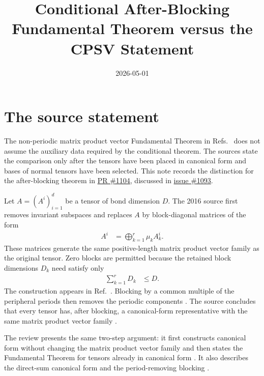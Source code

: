 \documentclass{article}
\title{Conditional After-Blocking Fundamental Theorem versus the CPSV Statement}
\author{}
\date{2026-05-01}
\begin{document}
\maketitle
{}

\section{The source statement}

The non-periodic matrix product vector Fundamental Theorem in
Refs.~\cite{Cirac2016MPDO_arXiv,Cirac2017MPDO_AnnPhys,Cirac2021Matrix} does not
assume the auxiliary data required by the conditional \Lean{} theorem. The
sources state the comparison only after the tensors have been placed in
canonical form and bases of normal tensors have been selected. This note
records the distinction for the after-blocking theorem in
\href{https://github.com/LionSR/TNLean/pull/1104}{PR \#1104}, discussed in
\href{https://github.com/LionSR/TNLean/issues/1093}{issue \#1093}.

Let $A=(A^i)_{i=1}^{d}$ be a tensor of bond dimension $D$. The 2016 source first
removes invariant subspaces and replaces $A$ by block-diagonal matrices of the
form
\begin{align}
    A^i
        &=
        \bigoplus_{k=1}^{r}\mu_k A_k^i.
    \label{eq:rmp_conditional_after_blocking_ft_statement_canonical_blocks}
\end{align}
These matrices generate the same positive-length matrix product vector family
as the original tensor. Zero blocks are permitted because the retained block
dimensions $D_k$ need satisfy only
\begin{align}
    \sum_{k=1}^{r}D_k
        &\leq D.
    \label{eq:rmp_conditional_after_blocking_ft_statement_retained_dimension}
\end{align}
The construction appears in
Ref.~\cite[lines~214--219]{Cirac2016MPDO_arXiv}. Blocking by a common multiple
of the peripheral periods then removes the periodic components
\cite[lines~227--231]{Cirac2016MPDO_arXiv}. The source concludes that every
tensor has, after blocking, a canonical-form representative with the same
matrix product vector family
\cite[lines~249--251]{Cirac2016MPDO_arXiv}.

The review presents the same two-step argument: it first constructs canonical
form without changing the matrix product vector family and then states the
Fundamental Theorem for tensors already in canonical form
\cite[lines~1752--1758]{Cirac2021Matrix}. It also describes the direct-sum
canonical form and the period-removing blocking
\cite[lines~1798--1820]{Cirac2021Matrix}.
\end{document}
